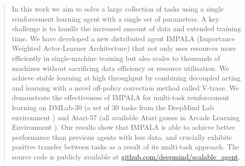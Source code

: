 \begin{abstract}

In this work we aim to solve a large collection of tasks using a single reinforcement learning agent with a single set of parameters. A key challenge is to handle the increased amount of data and extended training time. We have developed a new distributed agent IMPALA (Importance Weighted Actor-Learner Architecture) that not only uses resources more efficiently in single-machine training but also scales to thousands of machines without sacrificing data efficiency or resource utilisation. We achieve stable learning at high throughput by combining decoupled acting and learning with a novel off-policy correction method called V-trace.
We demonstrate the effectiveness of IMPALA for multi-task reinforcement learning on DMLab-30 (a set of 30 tasks from the DeepMind Lab environment \cite{beattie2016dmlab}) and Atari-57 (all available Atari games in Arcade Learning Environment \cite{bellemare13arcade}). Our results show that IMPALA is able to achieve better performance than previous agents with less data, and crucially exhibits positive transfer between tasks as a result of its multi-task approach. The source code is publicly available at \href{https://github.com/deepmind/scalable_agent}{github.com/deepmind/scalable\_agent}.





\end{abstract}
